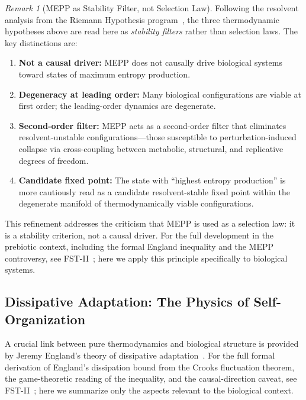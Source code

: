 \documentclass[12pt,a4paper]{article}
\theoremstyle{remark}
\newtheorem{remark}{Remark}
\begin{document}
\begin{remark}[MEPP as Stability Filter, not Selection Law]
\label{rem:mepp-stability-biology}
Following the resolvent analysis from the Riemann Hypothesis program~\citep{GeigerRH2026b}, the three thermodynamic hypotheses above are read here as \emph{stability filters} rather than selection laws. The key distinctions are:
\begin{enumerate}[label=(\roman*)]
  \item \textbf{Not a causal driver:} MEPP does not causally drive biological systems toward states of maximum entropy production.
  \item \textbf{Degeneracy at leading order:} Many biological configurations are viable at first order; the leading-order dynamics are degenerate.
  \item \textbf{Second-order filter:} MEPP acts as a second-order filter that eliminates resolvent-unstable configurations---those susceptible to perturbation-induced collapse via cross-coupling between metabolic, structural, and replicative degrees of freedom.
  \item \textbf{Candidate fixed point:} The state with ``highest entropy production'' is more cautiously read as a candidate resolvent-stable fixed point within the degenerate manifold of thermodynamically viable configurations.
\end{enumerate}
This refinement addresses the criticism that MEPP is used as a selection law: it is a stability criterion, not a causal driver. For the full development in the prebiotic context, including the formal England inequality and the MEPP controversy, see FST-II~\citep{FSTII}; here we apply this principle specifically to biological systems.
\end{remark}

\subsection{Dissipative Adaptation: The Physics of Self-Organization}

A crucial link between pure thermodynamics and biological structure is provided by Jeremy England's theory of dissipative adaptation~\citep{England2013,EnglandNano}. For the full formal derivation of England's dissipation bound from the Crooks fluctuation theorem, the game-theoretic reading of the inequality, and the causal-direction caveat, see FST-II~\citep{FSTII}; here we summarize only the aspects relevant to the biological context.
\end{document}
